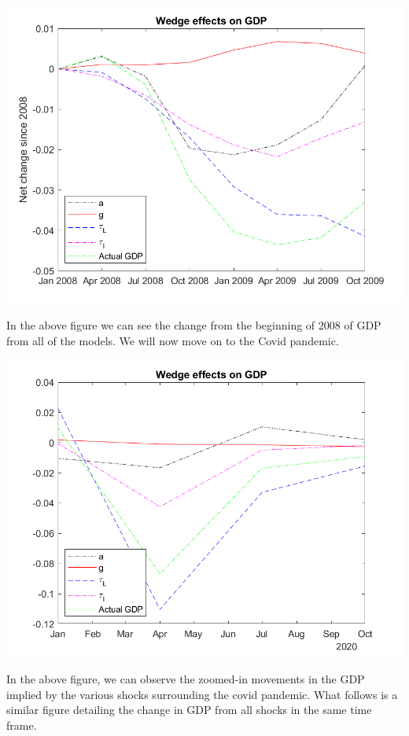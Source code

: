 \documentclass[11pt]{article} %
\begin{document}
\includegraphics{wedgesfindiff}

In the above figure we can see the change from the beginning of 2008 of GDP from all of the models. We will now move on to the Covid pandemic.

\includegraphics{wedgescov}

In the above figure, we can observe the zoomed-in movements in the GDP implied by the various shocks surrounding the covid pandemic. What follows is a similar figure detailing the change in GDP from all shocks in the same time frame.
\end{document}
